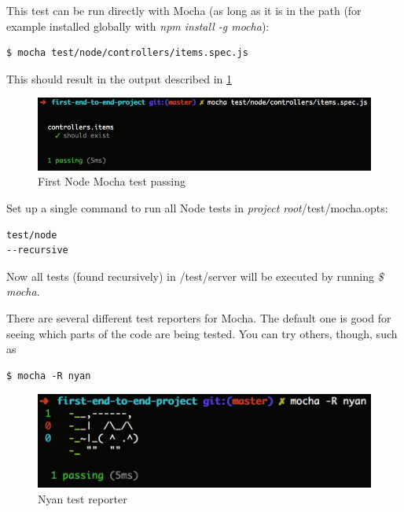 \documentclass[british]{article}
\begin{document}
This test can be run directly with Mocha (as long as it is in the path (for example installed globally with \textit{npm install -g mocha}):

\begin{lstlisting}
$ mocha test/node/controllers/items.spec.js
\end{lstlisting}

This should result in the output described in \ref{fig:first-node-mocha-test-passing}

\begin{figure}[H]
    \label{fig:first-node-mocha-test-passing}
    \centerline{\includegraphics[scale=0.7]{first-node-mocha-test-passing}}
    \caption{First Node Mocha test passing}
\end{figure}

Set up a single command to run all Node tests in \textit{project root}/test/mocha.opts:

\begin{lstlisting}
test/node
--recursive
\end{lstlisting}

Now all tests (found recursively) in /test/server will be executed by running \textit{\$ mocha}.

There are several different test reporters for Mocha. The default one is good for seeing which parts of the code are being tested. You can try others, though, such as

\begin{lstlisting}
$ mocha -R nyan
\end{lstlisting}

\begin{figure}[H]
    \label{fig:nyan-test-reporter}
    \centerline{\includegraphics[scale=0.7]{nyan-test-reporter}}
    \caption{Nyan test reporter}
\end{figure}
\end{document}
